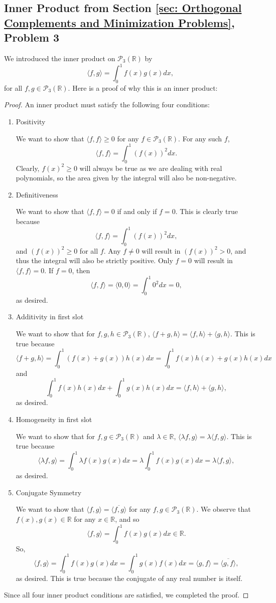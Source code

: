 \documentclass{article}
\newcommand{\R}{\mathbb{R}}
\newcommand{\la}{\langle}
\newcommand{\ra}{\rangle}
\theoremstyle{definition}
\begin{document}
\subsection{Inner Product from Section \ref{sec: Orthogonal Complements and Minimization Problems}, Problem 3}
\label{sec: inner-product-proof-1}

We introduced the inner product on $\mathcal{P}_3(\R)$ by $$\la f, g \ra = \int_0^1 f(x)g(x)dx,$$ for all $f, g \in \mathcal{P}_3(\R)$. Here is a proof of why this is an inner product:

\begin{proof}
    An inner product must satisfy the following four conditions:
    \begin{enumerate}
        \item Positivity

        We want to show that $\la f, f \ra \geq 0$ for any $f \in \mathcal{P}_3(\R)$. For any such $f$, $$\la f, f \ra = \int_0^1 (f(x))^2 dx.$$ Clearly, $f(x)^2 \geq 0$ will always be true as we are dealing with real polynomials, so the area given by the integral will also be non-negative.
        \item Definitiveness

        We want to show that $\la f, f \ra = 0$ if and only if $f = 0$. This is clearly true because $$\la f, f \ra = \int_0^1 (f(x))^2 dx,$$ and $(f(x))^2 \geq 0$ for all $f$. Any $f \neq 0$ will result in $(f(x))^2 > 0$, and thus the integral will also be strictly positive. Only $f = 0$ will result in $\la f, f \ra = 0$. If $f = 0$, then $$\la f, f \ra = \la 0, 0 \ra = \int_0^1 0^2 dx = 0,$$ as desired.
        \item Additivity in first slot

        We want to show that for $f, g, h \in \mathcal{P}_3(\R)$, $\la f + g, h \ra = \la f, h \ra + \la g, h \ra$. This is true because $$\la f + g, h \ra = \int_0^1 (f(x) + g(x))h(x)dx = \int_0^1 f(x)h(x) + g(x)h(x) dx$$ and $$\int_0^1 f(x)h(x) dx + \int_0^1 g(x)h(x) dx = \la f, h \ra + \la g, h \ra,$$ as desired.
        \item Homogeneity in first slot

        We want to show that for $f, g \in \mathcal{P}_3(\R)$ and $\lambda \in \R$, $\la \lambda f, g \ra = \lambda \la f, g \ra$. This is true because $$\la \lambda f, g \ra = \int_0^1 \lambda f(x)g(x)dx = \lambda \int_0^1 f(x)g(x)dx = \lambda \la f, g \ra,$$ as desired.

        \item Conjugate Symmetry

        We want to show that $\la f, g \ra = \overline{\la f, g \ra}$ for any $f, g \in \mathcal{P}_3(\R)$. We observe that $f(x), g(x) \in \R$ for any $x \in \R$, and so $$\la f, g \ra = \int_0^1 f(x)g(x)dx \in \R.$$ So, $$\la f, g \ra = \int_0^1 f(x)g(x)dx = \int_0^1 g(x)f(x)dx = \la g, f \ra = \overline{\la g, f \ra},$$ as desired. This is true because the conjugate of any real number is itself.
    \end{enumerate}
    Since all four inner product conditions are satisfied, we completed the proof.
\end{proof}
\end{document}
